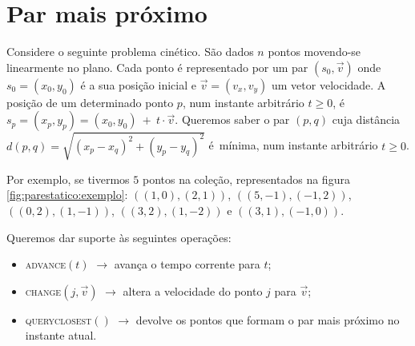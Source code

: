 \chapter{Par mais próximo}

Considere o seguinte problema cinético. São dados $n$ pontos
movendo-se linearmente no plano. Cada ponto é representado por um
par $(s_0, \vec{v})$ onde $s_0 = (x_0, y_0)$ é a sua posição inicial
e $\vec{v} = (v_x, v_y)$ um vetor velocidade. A posição de um
determinado ponto $p$, num instante arbitrário $t \geq 0$, é $s_p =
(x_p, y_p) = (x_0, y_0)~+~t\cdot \vec{v}$. Queremos saber o par $(p,
q)$ cuja distância $d(p, q) = \sqrt{(x_p - x_q)^2 + (y_p - y_q)^2}$
é~mínima, num instante arbitrário $t \geq 0$.

Por exemplo, se tivermos $5$ pontos na coleção, representados na
figura \ref{fig:parestatico:exemplo}: $((1, 0), (2, 1))$, $((5, -1),
(-1, 2))$, $((0, 2), (1, -1))$, $((3, 2), (1, -2))$ e $((3, 1), (-1,
0))$.



Queremos dar suporte às seguintes operações:
\begin{itemize}
    \item \textsc{advance}$(t)$ $\rightarrow$ avança o tempo corrente
    para $t$;
    \item \textsc{change}$(j, \vec{v})$ $\rightarrow$ altera a
    velocidade do ponto $j$ para $\vec{v}$;
    \item \textsc{query\textunderscore closest}$()$ $\rightarrow$
    devolve os pontos que formam o par mais próximo no instante
    atual.
\end{itemize}



